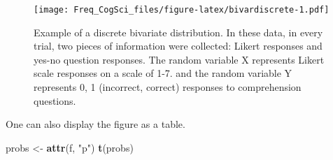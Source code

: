 \documentclass[12pt,]{krantz}
\newenvironment{Shaded}{\begin{snugshade}}{\end{snugshade}}
\newcommand{\CommentTok}[1]{\textcolor[rgb]{0.56,0.35,0.01}{\textit{#1}}}
\newcommand{\DataTypeTok}[1]{\textcolor[rgb]{0.13,0.29,0.53}{#1}}
\newcommand{\DecValTok}[1]{\textcolor[rgb]{0.00,0.00,0.81}{#1}}
\newcommand{\KeywordTok}[1]{\textcolor[rgb]{0.13,0.29,0.53}{\textbf{#1}}}
\newcommand{\NormalTok}[1]{#1}
\newcommand{\OperatorTok}[1]{\textcolor[rgb]{0.81,0.36,0.00}{\textbf{#1}}}
\newcommand{\OtherTok}[1]{\textcolor[rgb]{0.56,0.35,0.01}{#1}}
\newcommand{\StringTok}[1]{\textcolor[rgb]{0.31,0.60,0.02}{#1}}
\begin{document}
\begin{Shaded}
\end{Shaded}

\begin{figure}
\centering
\texttt{[image: Freq\_CogSci\_files/figure-latex/bivardiscrete-1.pdf]}
\caption{\label{fig:bivardiscrete}Example of a discrete bivariate distribution. In these data, in every trial, two pieces of information were collected: Likert responses and yes-no question responses. The random variable X represents Likert scale responses on a scale of 1-7. and the random variable Y represents 0, 1 (incorrect, correct) responses to comprehension questions.}
\end{figure}

One can also display the figure as a table.

\begin{Shaded}
\begin{Highlighting}[]
\NormalTok{probs <-}\StringTok{ }\KeywordTok{attr}\NormalTok{(f, }\StringTok{"p"}\NormalTok{)}
\KeywordTok{t}\NormalTok{(probs)}
\end{Highlighting}
\end{Shaded}
\end{document}
